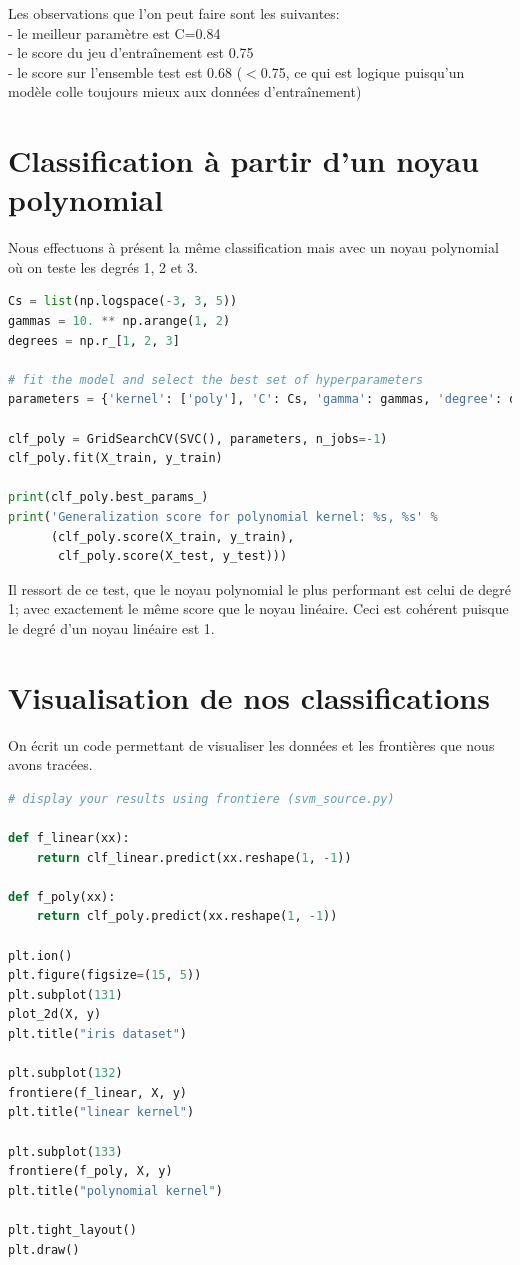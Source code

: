 \documentclass{book}
\begin{document}
Les observations que l'on peut faire sont les suivantes:\\ 
- le meilleur paramètre est C=0.84\\
- le score du jeu d'entraînement est 0.75 \\
- le score sur l'ensemble test est 0.68 ($<$0.75, ce qui est logique puisqu'un modèle colle toujours mieux aux données d'entraînement) 

\section{Classification à partir d'un noyau polynomial}

Nous effectuons à présent la même classification mais avec un noyau polynomial où on teste les degrés 1, 2 et 3. 

\begin{lstlisting}[language=Python, caption=Classification des classes 1 contre 2 avec noyau polynomial]
Cs = list(np.logspace(-3, 3, 5))
gammas = 10. ** np.arange(1, 2)
degrees = np.r_[1, 2, 3]

# fit the model and select the best set of hyperparameters
parameters = {'kernel': ['poly'], 'C': Cs, 'gamma': gammas, 'degree': degrees}

clf_poly = GridSearchCV(SVC(), parameters, n_jobs=-1)
clf_poly.fit(X_train, y_train)

print(clf_poly.best_params_)
print('Generalization score for polynomial kernel: %s, %s' %
      (clf_poly.score(X_train, y_train),
       clf_poly.score(X_test, y_test)))
\end{lstlisting}

Il ressort de ce test, que le noyau polynomial le plus performant est celui de degré 1; avec exactement le même score que le noyau linéaire. Ceci est cohérent puisque le degré d'un noyau linéaire est 1. 

\section{Visualisation de nos classifications}

On écrit un code permettant de visualiser les données et les frontières que nous avons tracées.

\begin{lstlisting}[language=Python, caption=Visualisation des données et des classifications]
# display your results using frontiere (svm_source.py)

def f_linear(xx):
    return clf_linear.predict(xx.reshape(1, -1))

def f_poly(xx):
    return clf_poly.predict(xx.reshape(1, -1))

plt.ion()
plt.figure(figsize=(15, 5))
plt.subplot(131)
plot_2d(X, y)
plt.title("iris dataset")

plt.subplot(132)
frontiere(f_linear, X, y)
plt.title("linear kernel")

plt.subplot(133)
frontiere(f_poly, X, y)
plt.title("polynomial kernel")

plt.tight_layout()
plt.draw()
\end{lstlisting}
\end{document}
